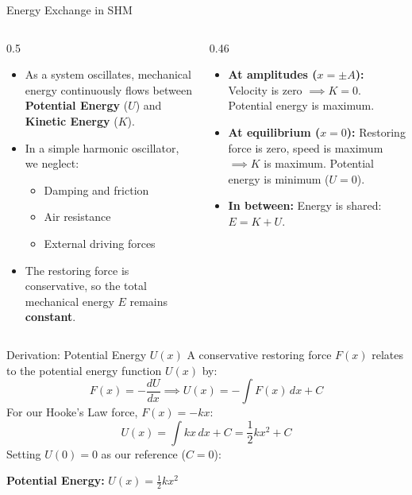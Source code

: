 \documentclass[aspectratio=169,xcolor=dvipsnames]{beamer}
\begin{document}
\begin{frame}{Energy Exchange in SHM}
  \begin{columns}[T]
    \begin{column}{0.5\textwidth}
      \begin{itemize}
        \item As a system oscillates, mechanical energy continuously flows between \textbf{Potential Energy} ($U$) and \textbf{Kinetic Energy} ($K$).
        \item In a simple harmonic oscillator, we neglect:
              \begin{itemize}
                \item Damping and friction
                \item Air resistance
                \item External driving forces
              \end{itemize}
        \item The restoring force is conservative, so the total mechanical energy $E$ remains \textbf{constant}.
      \end{itemize}
    \end{column}
    \begin{column}{0.46\textwidth}
      \begin{umnote}
        \small
        \begin{itemize}
          \item \textbf{At amplitudes ($x = \pm A$):} Velocity is zero $\implies K = 0$. Potential energy is maximum.
          \item \textbf{At equilibrium ($x = 0$):} Restoring force is zero, speed is maximum $\implies K$ is maximum. Potential energy is minimum ($U = 0$).
          \item \textbf{In between:} Energy is shared: $E = K + U$.
        \end{itemize}
      \end{umnote}
    \end{column}
  \end{columns}
\end{frame}

\begin{frame}{Derivation: Potential Energy $U(x)$}
  A conservative restoring force $F(x)$ relates to the potential energy function $U(x)$ by:
  \begin{equation*}
    F(x) = -\frac{dU}{dx} \implies U(x) = -\int F(x) \, dx + C
  \end{equation*}
  \pause
  For our Hooke's Law force, $F(x) = -kx$:
  \begin{equation*}
    U(x) = \int kx \, dx + C = \frac{1}{2}kx^2 + C
  \end{equation*}
  \pause
  Setting $U(0) = 0$ as our reference ($C = 0$):
  \begin{umformula}
    \textbf{Potential Energy:} \quad $\boxed{U(x) = \frac{1}{2}kx^2}$
  \end{umformula}
\end{frame}
\end{document}
